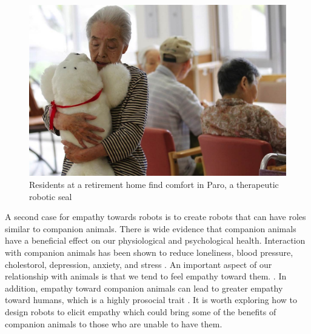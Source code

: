    \begin{figure}[thpb]
      \centering
      \includegraphics[width=4.6in]{figures/intro/paro_large.jpg}
      \caption{Residents at a retirement home find comfort in Paro, a therapeutic robotic seal\cite{nbcnews_paro}}
      \label{fig_intro_paro}
   \end{figure}
   

A second case for empathy towards robots is to create robots that can have roles similar to companion animals. There is wide evidence that companion animals have a beneficial effect on our physiological and psychological health. Interaction with companion animals has been shown to reduce loneliness, blood pressure, cholestorol, depression, anxiety, and stress \cite{walsh_human_animal_bond}. An important aspect of our relationship with animals is that we tend to feel empathy toward them. \cite{phillips_empathy_animals}. In addition, empathy toward companion animals can lead to greater empathy toward humans, which is a highly prosocial trait \cite{gullone_empathy_prosocial_pets}. It is worth exploring how to design robots to elicit empathy which could bring some of the benefits of companion animals to those who are unable to have them. 




